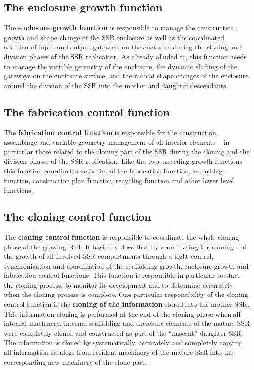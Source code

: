 \bigskip

\subsection[The enclosure growth function]{The enclosure growth
function}
\hypertarget{RefHeading3096306210128}{}The \textbf{enclosure growth
function} is responsible to manage the construction, growth and shape
change of the SSR enclosure as well as the coordinated addition of
input and output gateways on the enclosure during the cloning and
division phases of the SSR replication. As already alluded to, this
function needs to manage the variable geometry of the enclosure, the
dynamic shifting of the gateways on the enclosure surface, and the
radical shape changes of the enclosure around the division of the SSR
into the mother and daughter descendants.


\bigskip

\subsection[The fabrication control function]{The fabrication control
function}
\hypertarget{RefHeading3098306210128}{}The \textbf{fabrication control
function} is responsible for the construction, assemblage and variable
geometry management of all interior elements – in particular those
related to the cloning part of the SSR during the cloning and the
division phases of the SSR replication.  Like the two preceding growth
functions this function coordinates activities of the fabrication
function, assemblage function, construction plan function, recycling
function and other lower level functions. 


\bigskip

\subsection[The cloning control function]{The cloning control function}
\hypertarget{RefHeading3100306210128}{}The \textbf{cloning control
function} is responsible to coordinate the whole cloning phase of the
growing SSR. It basically does that by coordinating the cloning and the
growth of all involved SSR compartments through a tight control,
synchronization and coordination of the scaffolding growth, enclosure
growth and fabrication control functions. This function is responsible
in particular to start the cloning process, to monitor its development
and to determine accurately when the cloning process is complete. One
particular responsibility of the cloning control function is the
\textbf{cloning of the information} stored into the mother SSR. This
information cloning is performed at the end of the cloning phase when
all internal machinery, internal scaffolding and enclosure elements of
the mature SSR were completely cloned and constructed as part of the
“nascent” daughter SSR. The information is cloned by systematically,
accurately and completely copying all information catalogs from
resident machinery of the mature SSR into the corresponding new
machinery of the clone part.


